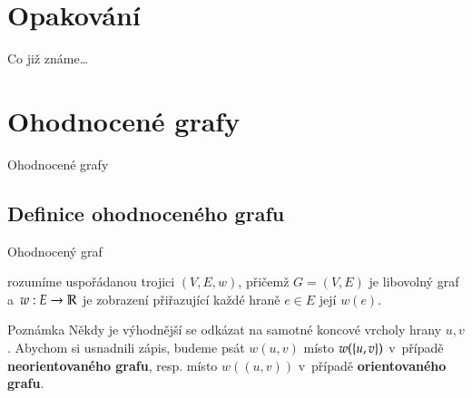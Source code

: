 \documentclass[11pt,professionalfont,aspectratio=43]{beamer}
\begin{document}
    

    \section{Opakování}

    \begin{frame}{Co již známe\dots}
        \begin{itemize}
        \end{itemize}
    \end{frame}

    \section{Ohodnocené grafy}

    \begin{titleframeenv}{Ohodnocené grafy}
    \end{titleframeenv}

    \subsection{Definice ohodnoceného grafu}

    \begin{frame}{Ohodnocený graf}
        \begin{defblock}
             rozumíme uspořádanou trojici $(V,E,w)$, přičemž $G=(V,E)$ je libovolný graf a~$w:E \rightarrow \mathbb{R}$ je zobrazení přiřazující každé hraně $e\in E$ její  $w(e)$.
        \end{defblock}
        \begin{tinfobox*}{Poznámka}
            Někdy je výhodnější se odkázat na samotné koncové vrcholy hrany $u,v$. Abychom si usnadnili zápis, budeme psát $w(u,v)$ místo $w(\left\{u,v\right\})$ v~případě \textbf{neorientovaného grafu}, resp. místo $w((u,v))$ v~případě \textbf{orientovaného grafu}.
        \end{tinfobox*}
    \end{frame}
\end{document}
